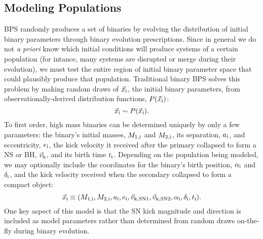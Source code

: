 \documentclass[usenatbib]{mnras}
\begin{document}
\subsection{Modeling Populations}
\label{sec:stats_population}


BPS randomly produces a set of binaries by evolving the distribution of initial binary parameters through binary evolution prescriptions. Since in general we do not {\it a priori} know which initial conditions will produce systems of a certain population (for intance, many systems are disrupted or merge during their evolution), we must test the entire region of initial binary parameter space that could plausibly produce that population. Traditional binary BPS solves this problem by making random draws of $\vec{x}_{\rm i}$, the initial binary parameters, from observationally-derived distribution functions, $P(\vec{x}_{\rm i})$:
\begin{equation}
\vec{x}_{\rm i} \sim P(\vec{x}_{\rm i}).
\end{equation}
To first order, high mass binaries can be determined uniquely by only a few parameters: the binary's initial masses, $M_{\rm 1,i}$ and $M_{\rm 2,i}$, its separation, $a_{\rm i}$, and eccentricity, $e_{\rm i}$, the kick velocity it received after the primary collapsed to form a NS or BH, $\vec{v}_{\rm k}$, and its birth time $t_{\rm i}$. Depending on the population being modeled, we may optionally include the coordinates for the binary's birth position, $\alpha_{\rm i}$ and $\delta_{\rm i}$, and the kick velocity received when the secondary collapsed to form a compact object:
\begin{equation}
\vec{x}_{\rm i} \equiv ( M_{\rm 1,i}, M_{\rm 2,i}, a_{\rm i}, e_{\rm i}, \vec{v}_{\rm k, SN1}, \vec{v}_{\rm k, SN2}, \alpha_{\rm i}, \delta_{\rm i}, t_{\rm i} ). \label{eq:x_i}
\end{equation}
One key aspect of this model is that the SN kick magnitude and direction is included as model parameters rather than determined from random draws on-the-fly during binary evolution.
\end{document}
